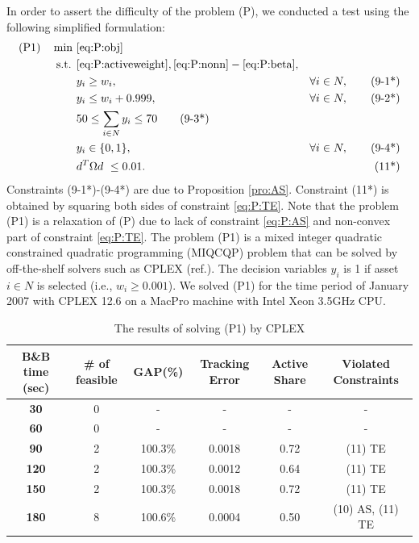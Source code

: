 \documentclass[11pt]{article}
\begin{document}
	In order to assert the difficulty of the problem (P), we conducted a test using the following simplified formulation:
	\begin{align*}
	\text{(P1)} \quad \min~ &\eqref{eq:P:obj}\\
	\text{s.t. } 
	& \eqref{eq:P:activeweight}, \eqref{eq:P:nonn} - \eqref{eq:P:beta}, \notag\\
	& y_i \geq w_i, & \forall i \in N, \tag{9-1*}\\
	& y_i \leq w_i + 0.999, & \forall i \in N, \tag{9-2*}\\
	& 50 \leq \sum_{i \in N} y_i \leq 70 \tag{9-3*}\\
	& y_i \in \{0,1\}, & \forall i \in N, \tag{9-4*}\\
	&  d^T \Omega  d \  \leq 0.01. & \tag{11*}
	\end{align*} 
	Constraints (9-1*)-(9-4*) are due to Proposition \ref{pro:AS}. Constraint (11*) is obtained by squaring both sides of constraint \eqref{eq:P:TE}. Note that the problem (P1) is a relaxation of (P) due to lack of constraint \eqref{eq:P:AS} and non-convex part of constraint \eqref{eq:P:TE}. The problem (P1) is a mixed integer quadratic constrained quadratic programming (MIQCQP) problem that can be solved by off-the-shelf solvers such as CPLEX (ref.). The decision variables $y_i$ is 1 if asset $i \in N$ is selected (i.e., $w_i \ge 0.001$). We solved (P1) for the time period of January 2007 with CPLEX 12.6 on a MacPro machine with Intel Xeon 3.5GHz CPU. 
	
	\begin{table}[]
		\centering
		\footnotesize 
		\caption{The results of solving (P1) by CPLEX}
		\label{tab:pre}
		\begin{tabular}{cccccc}
			\toprule
			\textbf{B\&B time (sec)} & \textbf{\# of feasible} & \textbf{GAP(\%)} & \textbf{Tracking Error} & \textbf{Active Share} & \textbf{Violated Constraints} \\
			\midrule
			\textbf{30} & 0 & - & - & - & -  \\
			\textbf{60} & 0 & - & - & - & -  \\
			\textbf{90} & 2 & 100.3\% & {\color[HTML]{CB0000} 0.0018} & 0.72 & (11) TE \\
			\textbf{120} & 2 & 100.3\% & {\color[HTML]{CB0000} 0.0012} & 0.64 & (11) TE \\
			\textbf{150} & 2 & 100.3\% & {\color[HTML]{CB0000} 0.0018} & 0.72 & (11) TE \\
			\textbf{180} & 8 & 100.6\% & {\color[HTML]{CB0000} 0.0004} & {\color[HTML]{CB0000} 0.50} & (10) AS, (11) TE  \\ 
			\bottomrule
		\end{tabular}
	\end{table}
	
\end{document}
